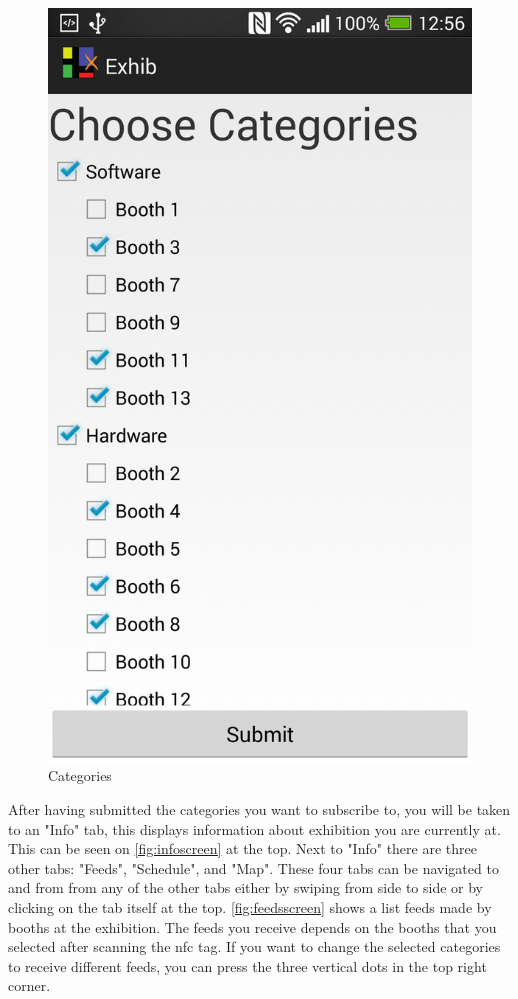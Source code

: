 \begin{figure}[H]
\begin{minipage}[b]{0.5\columnwidth}
\includegraphics[width=\columnwidth]{img/finaldesign/categories.png}
\caption{Categories}
\label{fig:categories}
\end{minipage}
\end{figure}

After having submitted the categories you want to subscribe to, you will be taken to an "Info" tab, this displays information about exhibition you are currently at. This can be seen on \autoref{fig:infoscreen}  at the top. Next to "Info" there are three other tabs: "Feeds", "Schedule", and "Map". These four tabs can be navigated to and from from any of the other tabs either by swiping from side to side or by clicking on the tab itself at the top. \autoref{fig:feedsscreen} shows a list feeds made by booths at the exhibition. The feeds you receive depends on the booths that you selected after scanning the \ac{nfc} tag. If you want to change the selected categories to receive different feeds, you can press the three vertical dots in the top right corner. 

